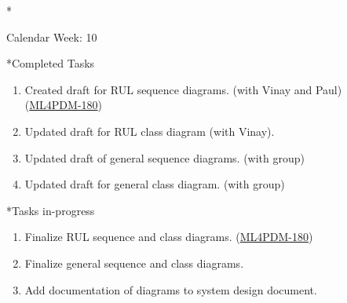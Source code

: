 \documentclass[11pt,a4paper]{article}
\begin{document}
\newpage
\begin{section}*{Calendar Week: 10 \hfill \date{12 March, 2021}}
 \begin{refsection}
   \begin{subsection}*{Completed Tasks}
     \begin{enumerate}
       \item
             Created draft for RUL sequence diagrams. (with Vinay and Paul)\\
             (\href{https://ml4pdm.atlassian.net/browse/ML4PDM-180}{ML4PDM-180})
       \item
             Updated draft for RUL class diagram (with Vinay).
       \item
             Updated draft of general sequence diagrams. (with group)
       \item
             Updated draft for general class diagram. (with group)
     \end{enumerate}
   \end{subsection}
   \begin{subsection}*{Tasks in-progress}
     \begin{enumerate}
       \item
             Finalize RUL sequence and class diagrams. (\href{https://ml4pdm.atlassian.net/browse/ML4PDM-180}{ML4PDM-180})
       \item
             Finalize general sequence and class diagrams.
       \item
             Add documentation of diagrams to system design document.
     \end{enumerate}
   \end{subsection}
 \end{refsection}
\end{section}
\end{document}
